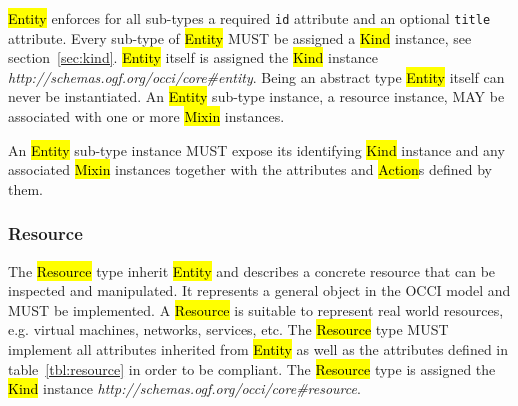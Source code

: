 \documentclass[10pt,a4paper,british]{article}
\begin{document}

\hl{Entity} enforces for all sub-types a required \texttt{id} attribute and an
optional \texttt{title} attribute.
%
Every sub-type of \hl{Entity} MUST be assigned a \hl{Kind} instance, see
section~\ref{sec:kind}. \hl{Entity} itself is assigned the \hl{Kind} instance
\textit{http://schemas.ogf.org/occi/core\#entity}. Being an abstract type \hl{Entity}
itself can never be instantiated.
%
An \hl{Entity} sub-type instance, a resource instance, MAY be associated with
one or more \hl{Mixin} instances.

An \hl{Entity} sub-type instance MUST expose its identifying \hl{Kind} instance
and any associated \hl{Mixin} instances together with the attributes and
\hl{Action}s defined by them.

\subsubsection{Resource}
\label{sec:resource}
The \hl{Resource} type inherit \hl{Entity} and describes a concrete resource that
can be inspected and manipulated. It represents a general object in the OCCI
model and MUST be implemented. A \hl{Resource} is suitable to represent real
world resources, e.g. virtual machines, networks, services, etc.
%
The \hl{Resource} type MUST implement all attributes inherited from \hl{Entity}
as well as the attributes defined in table~\ref{tbl:resource} in order
to be compliant.
%
The \hl{Resource} type is assigned the \hl{Kind} instance
\textit{http://schemas.ogf.org/occi/core\#resource}.
\end{document}
